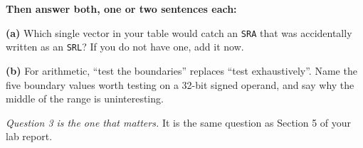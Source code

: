 \documentclass[11pt]{article}
\newcommand{\code}[1]{\texttt{#1}}
\newcommand{\answerbox}[1]{\vspace{2pt}\fbox{\parbox[c][#1][c]{\dimexpr\linewidth-2\fboxsep-2\fboxrule}{\ }}\vspace{4pt}}
\begin{document}
\textbf{Then answer both, one or two sentences each:}

\textbf{(a)} Which single vector in your table would catch an \code{SRA} that was
accidentally written as an \code{SRL}? If you do not have one, add it now.

\answerbox{1.6cm}

\textbf{(b)} For arithmetic, ``test the boundaries'' replaces ``test
exhaustively''. Name the five boundary values worth testing on a 32-bit signed
operand, and say why the middle of the range is uninteresting.

\answerbox{2.2cm}

\vfill
{\small\emph{Question 3 is the one that matters.} It is the same question as
Section 5 of your lab report.}
\end{document}

